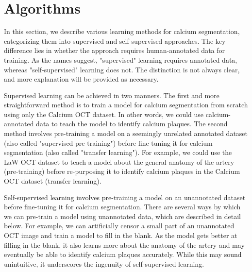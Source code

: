 \documentclass[a4paper,11pt,oneside]{report}
\begin{document}
\newpage
\section{Algorithms}
In this section, we describe various learning methods for calcium segmentation, categorizing them into supervised and self-supervised approaches. The key difference lies in whether the approach requires human-annotated data for training. As the names suggest, "supervised" learning requires annotated data, whereas "self-supervised" learning does not. The distinction is not always clear, and more explanation will be provided as necessary.

Supervised learning can be achieved in two manners. The first and more straightforward method is to train a model for calcium segmentation from scratch using only the Calcium OCT dataset. In other words, we could use calcium-annotated data to teach the model to identify calcium plaques. The second method involves pre-training a model on a seemingly unrelated annotated dataset (also called "supervised pre-training") before fine-tuning it for calcium segmentation (also called "transfer learning"). For example, we could use the LaW OCT dataset to teach a model about the general anatomy of the artery (pre-training) before re-purposing it to identify calcium plaques in the Calcium OCT dataset (transfer learning). 

Self-supervised learning involves pre-training a model on an unannotated dataset before fine-tuning it for calcium segmentation. There are several ways by which we can pre-train a model using unannotated data, which are described in detail below. For example, we can artificially censor a small part of an unannotated OCT image and train a model to fill in the blank. As the model gets better at filling in the blank, it also learns more about the anatomy of the artery and may eventually be able to identify calcium plaques accurately. While this may sound unintuitive, it underscores the ingenuity of self-supervised learning.  

\end{document}
